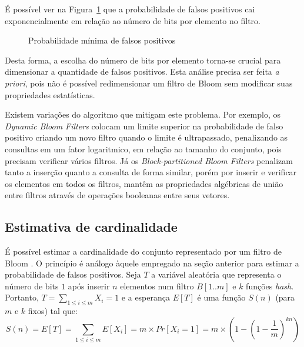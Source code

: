 É possível ver na Figura~\ref{fig:probfalso2} que a probabilidade de falsos positivos cai exponencialmente em relação ao número de bits por elemento no filtro.

\begin{figure}[!htbp]
\centering
{}
\caption{Probabilidade mínima de falsos positivos}
\label{fig:probfalso2}
\end{figure}

Desta forma, a escolha do número de bits por elemento torna-se crucial para dimensionar a quantidade de falsos positivos. Esta análise precisa ser feita \emph{a priori}, pois não é possível redimensionar um filtro de Bloom sem modificar suas propriedades estatísticas. 

Existem variações do algoritmo que mitigam este problema. Por exemplo, os \emph{Dynamic Bloom Filters} \cite{guo2010dynamic} colocam um limite superior na probabilidade de falso positivo criando um novo filtro quando o limite é ultrapassado, penalizando as consultas em um fator logaritmico, em relação ao tamanho do conjunto, pois precisam verificar vários filtros. Já os \emph{Block-partitioned Bloom Filters} \cite{papapetrou2010cardinality} penalizam tanto a inserção quanto a consulta de forma similar, porém por inserir e verificar os elementos em todos os filtros, mantêm as propriedades algébricas de união entre filtros através de operações booleanas entre seus vetores.

\subsection{Estimativa de cardinalidade}\label{sec:bloom:cardinality}

É possível estimar a cardinalidade do conjunto representado por um filtro de Bloom \cite{whang1990linear,papapetrou2010cardinality}. O princípio é análogo àquele empregado na seção anterior para estimar a probabilidade de falsos positivos. Seja $T$ a variável aleatória que representa o número de bits $1$ após inserir $n$ elementos num filtro $B[1..m]$ e $k$ funções \emph{hash}. Portanto, $T = \sum_{1 \leq i \leq m} X_i = 1$ e a esperança $E[T]$ é uma função $S(n)$ (para $m$ e $k$ fixos) tal que:
\[
S(n) = E[T] = \sum_{1 \leq i \leq m} E[X_i] = m \times Pr[X_i = 1] = m \times \left( 1 - \left( 1 - \frac{1}{m}\right)^{kn} \right)
\]

